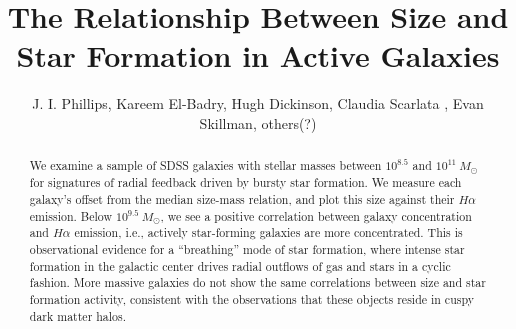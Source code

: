 \documentclass[iop]{emulateapj}
\begin{document}

\title{The Relationship Between Size and Star Formation in Active Galaxies}


\author{J. I. Phillips, Kareem El-Badry, Hugh Dickinson,  Claudia Scarlata , Evan Skillman, others(?)}




\begin{abstract}
We examine a sample of SDSS galaxies with stellar masses between $10^{8.5}$ and $10^{11} \ M_{\odot}$ for signatures of radial feedback driven by bursty star formation. We measure each galaxy's offset from the median size-mass relation, and plot this size against their $H\alpha$ emission. Below $10^{9.5}\ M_{\odot}$, we see a positive correlation between galaxy concentration and $H\alpha$ emission, i.e., actively star-forming galaxies are more concentrated. This is observational evidence for a ``breathing'' mode of star formation, where intense star formation in the galactic center drives radial outflows of gas and stars in a cyclic fashion. More massive galaxies do not show the same correlations between size and star formation activity, consistent with the observations that these objects reside in cuspy dark matter halos.
\end{abstract}
\end{document}
